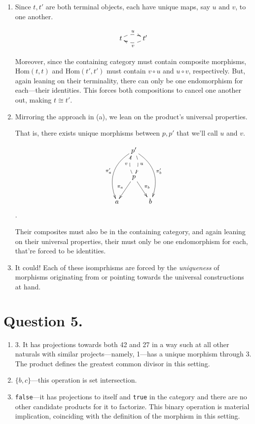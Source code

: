 \documentclass{article}
\begin{document}
\begin{enumerate}[label=(\alph*)]

\item Since $t, t'$ are both terminal objects, each have unique maps, say $u \textrm{ and } v$, to one another.

\[\xymatrix{t \ar@{-->}@/^/[r]^{u} & t' \ar@{-->}@/^/[l]^{v}}\]

Moreover, since the containing category must contain composite morphisms, $\textrm{Hom}(t, t)$ and $\textrm{Hom}(t', t')$ must contain $v \circ u$ and $u \circ v$, respectively. But, again leaning on their terminality, there can only be one endomorphism for each—their identities. This forces both compositions to cancel one another out, making $t \cong t'$.

\item Mirroring the approach in (a), we lean on the product’s universal properties.

That is, there exists unique morphisms between $p, p'$ that we’ll call $u$ and $v$.

\[
\xymatrix
@C=1pc
{
	  & p' \ar@{-->}@/^/[d]^{u} \ar@/_1.5pc/[ddl]_{\pi_a'} \ar@/^1.5pc/[ddr]^{\pi_b'} \\
	  & p \ar@{-->}@/^/[u]^{v} \ar[dl]_{\pi_a} \ar[dr]^{\pi_b} & \\
	a & & b
}
\].

Their composites must also be in the containing category, and again leaning on their universal properties, their must only be one endomorphism for each, that’re forced to be identities.

\item It could! Each of these isomprhisms are forced by the \textit{uniqueness} of morphisms originating from or pointing towards the universal constructions at hand.

\end{enumerate}

\section*{Question 5.}

\begin{enumerate}[label=(\alph*)]

\item 3. It has projections towards both 42 and 27 in a way such at all other naturals with similar projects—namely, 1—has a unique morphism through 3. The product defines the greatest common divisor in this setting.

\item $\{b, c\}$—this operation is set intersection.

\item \texttt{false}—it has projections to itself and \texttt{true} in the category and there are no other candidate products for it to factorize. This binary operation is material implication, coinciding with the definition of the morphism in this setting.

\end{enumerate}
\end{document}

